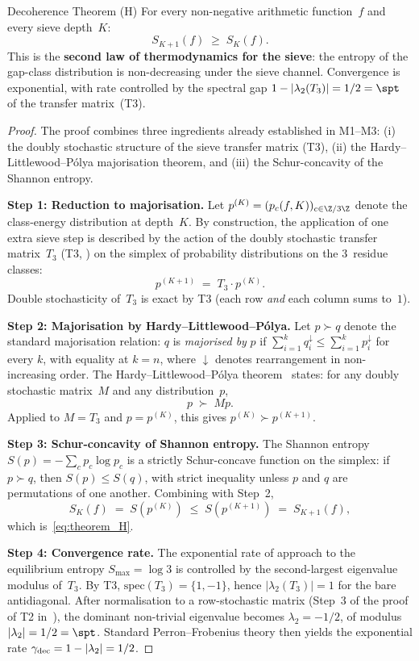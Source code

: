 \documentclass[12pt,a4paper]{article}
\begin{document}
\begin{thmbox}{Decoherence Theorem (H)}\mTHM
\label{thm:theorem_H}
For every non-negative arithmetic function~$f$ and every sieve
depth~$K$:
\begin{equation}
  S_{K+1}(f) \;\geq\; S_K(f).
  \label{eq:theorem_H}
\end{equation}
This is the \textbf{second law of thermodynamics for the sieve}:
the entropy of the gap-class distribution is non-decreasing under
the sieve channel.  Convergence is exponential, with rate controlled
by the spectral gap $1 - |\lambda_2(T_3)| = 1/2 = \spt$ of the
transfer matrix~(T3).
\end{thmbox}

\begin{proof}
The proof combines three ingredients already established in
M1--M3: (i) the doubly stochastic structure of the sieve transfer
matrix (T3), (ii) the Hardy--Littlewood--P\'olya majorisation
theorem, and (iii) the Schur-concavity of the Shannon entropy.

\textbf{Step 1: Reduction to majorisation.}
Let $p^{(K)} = (p_c(f,K))_{c \in \Z/3\Z}$ denote the class-energy
distribution at depth~$K$.  By construction, the application of one
extra sieve step is described by the action of the doubly stochastic
transfer matrix~$T_3$ (T3, \cite{companion_M1}) on the simplex of
probability distributions on the $3$~residue classes:
\[
  p^{(K+1)} \;=\; T_3 \cdot p^{(K)}.
\]
Double stochasticity of~$T_3$ is exact by T3 (each row \emph{and}
each column sums to~$1$).

\textbf{Step 2: Majorisation by Hardy--Littlewood--P\'olya.}
Let $p \succ q$ denote the standard majorisation relation: $q$ is
\emph{majorised by} $p$ if $\sum_{i=1}^{k} q_i^{\downarrow} \le
\sum_{i=1}^{k} p_i^{\downarrow}$ for every $k$, with equality at
$k = n$, where $\downarrow$ denotes rearrangement in non-increasing
order.  The Hardy--Littlewood--P\'olya theorem~\cite{HLP1934} states:
for any doubly stochastic matrix~$M$ and any distribution~$p$,
\[
  p \;\succ\; M p.
\]
Applied to $M = T_3$ and $p = p^{(K)}$, this gives
$p^{(K)} \succ p^{(K+1)}$.

\textbf{Step 3: Schur-concavity of Shannon entropy.}
The Shannon entropy
$S(p) = -\sum_c p_c \log p_c$
is a strictly Schur-concave function on the simplex: if
$p \succ q$, then $S(p) \le S(q)$, with strict inequality unless
$p$ and $q$ are permutations of one another.  Combining with Step~2,
\[
  S_K(f) \;=\; S(p^{(K)}) \;\le\; S(p^{(K+1)}) \;=\; S_{K+1}(f),
\]
which is~\eqref{eq:theorem_H}.

\textbf{Step 4: Convergence rate.}
The exponential rate of approach to the equilibrium entropy
$S_{\max} = \log 3$ is controlled by the second-largest eigenvalue
modulus of~$T_3$.  By T3, $\mathrm{spec}(T_3) = \{1, -1\}$, hence
$|\lambda_2(T_3)| = 1$ for the bare antidiagonal.  After
normalisation to a row-stochastic matrix (Step~3 of the proof of
T2 in~\cite{companion_M3}), the dominant non-trivial eigenvalue
becomes $\lambda_2 = -1/2$, of modulus $|\lambda_2| = 1/2 = \spt$.
Standard Perron--Frobenius theory then yields the exponential rate
$\gamma_{\rm dec} = 1 - |\lambda_2| = 1/2$.
\end{proof}
\end{document}
